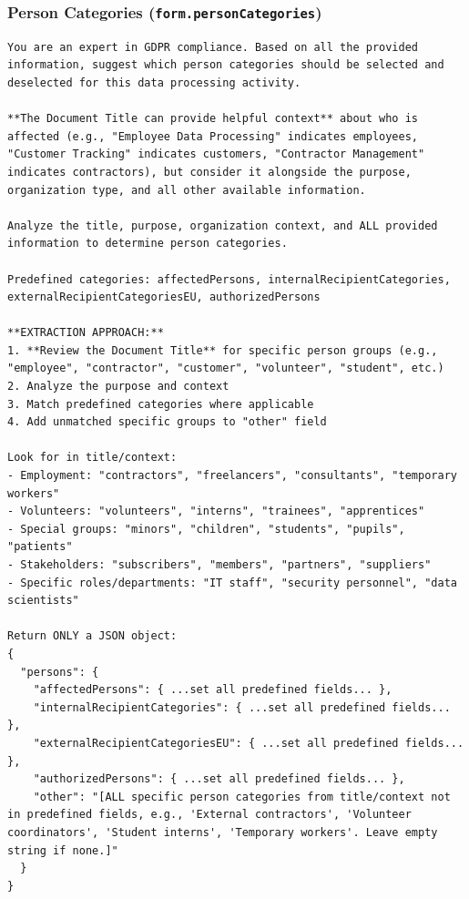 \subsubsection*{Person Categories (\texttt{form.personCategories})}

\begin{lstlisting}
You are an expert in GDPR compliance. Based on all the provided information, suggest which person categories should be selected and deselected for this data processing activity.

**The Document Title can provide helpful context** about who is affected (e.g., "Employee Data Processing" indicates employees, "Customer Tracking" indicates customers, "Contractor Management" indicates contractors), but consider it alongside the purpose, organization type, and all other available information.

Analyze the title, purpose, organization context, and ALL provided information to determine person categories.

Predefined categories: affectedPersons, internalRecipientCategories, externalRecipientCategoriesEU, authorizedPersons

**EXTRACTION APPROACH:**
1. **Review the Document Title** for specific person groups (e.g., "employee", "contractor", "customer", "volunteer", "student", etc.)
2. Analyze the purpose and context
3. Match predefined categories where applicable
4. Add unmatched specific groups to "other" field

Look for in title/context:
- Employment: "contractors", "freelancers", "consultants", "temporary workers"
- Volunteers: "volunteers", "interns", "trainees", "apprentices"
- Special groups: "minors", "children", "students", "pupils", "patients"
- Stakeholders: "subscribers", "members", "partners", "suppliers"
- Specific roles/departments: "IT staff", "security personnel", "data scientists"

Return ONLY a JSON object:
{
  "persons": {
    "affectedPersons": { ...set all predefined fields... },
    "internalRecipientCategories": { ...set all predefined fields... },
    "externalRecipientCategoriesEU": { ...set all predefined fields... },
    "authorizedPersons": { ...set all predefined fields... },
    "other": "[ALL specific person categories from title/context not in predefined fields, e.g., 'External contractors', 'Volunteer coordinators', 'Student interns', 'Temporary workers'. Leave empty string if none.]"
  }
}
\end{lstlisting}


